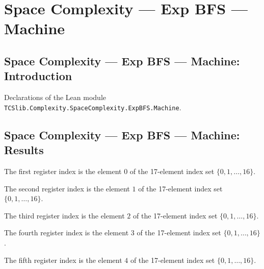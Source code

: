 \section{Space Complexity --- Exp BFS --- Machine}
\subsection*{Space Complexity --- Exp BFS --- Machine: Introduction}

Declarations of the Lean module \texttt{TCSlib.Complexity.SpaceComplexity.ExpBFS.Machine}.

\subsection*{Space Complexity --- Exp BFS --- Machine: Results}

\begin{definition}
\label{Complexity.LogProg.ExpBFS.rN}
\leanok
The first register index is the element $0$ of the 17-element index set
$\{0,1,\ldots,16\}$.
\end{definition}

\begin{definition}
\label{Complexity.LogProg.ExpBFS.rLg}
\leanok
The second register index is the element $1$ of the 17-element index set
$\{0,1,\ldots,16\}$.
\end{definition}

\begin{definition}
\label{Complexity.LogProg.ExpBFS.rs}
\leanok
The third register index is the element $2$ of the 17-element index set
$\{0,1,\ldots,16\}$.
\end{definition}

\begin{definition}
\label{Complexity.LogProg.ExpBFS.rs1}
\leanok
The fourth register index is the element $3$ of the 17-element index set
$\{0,1,\ldots,16\}$.
\end{definition}

\begin{definition}
\label{Complexity.LogProg.ExpBFS.rX}
\leanok
The fifth register index is the element $4$ of the 17-element index set
$\{0,1,\ldots,16\}$.
\end{definition}

